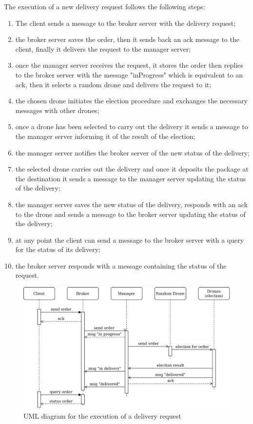 \documentclass[a4paper, oneside]{memoir}
\begin{document}
The execution of a new delivery request follows the following steps:
\begin{enumerate}
\item The client sends a message to the broker server with the delivery request;
\item the broker server saves the order, then it sends back an ack message to the client, finally it delivers the request to the manager server;
\item once the manager server receives the request, it stores the order then replies to the broker server with the message "inProgress" which is equivalent to an ack, then it selects a random drone and delivers the request to it;
\item the chosen drone initiates the election procedure and exchanges the necessary messages with other drones;
\item once a drone has been selected to carry out the delivery it sends a message to the manager server informing it of the result of the election;
\item the manager server notifies the broker server of the new status of the delivery;
\item the selected drone carries out the delivery and once it deposits the package at the destination it sends a message to the manager server updating the status of the delivery;
\item the manager server saves the new status of the delivery, responds with an ack to the drone and sends a message to the broker server updating the status of the delivery;
\item at any point the client can send a message to the broker server with a query for the status of its delivery;
\item the broker server responds with a message containing the status of the request.
\end{enumerate}

\begin{figure}[h!]
	\centering
	\includegraphics[width=\linewidth]{New-order}
	\caption{UML diagram for the execution of a delivery request}
\end{figure}
\end{document}
